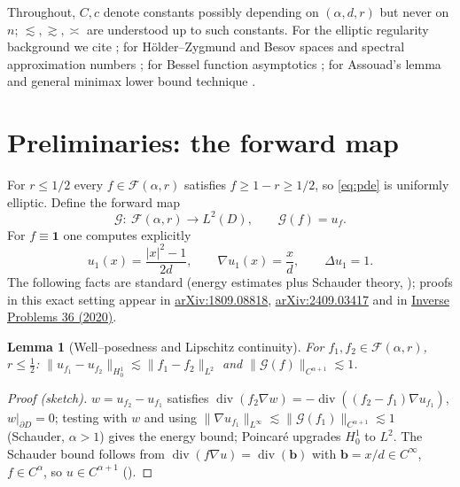 \documentclass[11pt]{article}
\newtheorem{lemma}[theorem]{Lemma}
\newcommand{\1}{\mathbf{1}}
\newcommand{\norm}[1]{\lVert #1\rVert}
\newcommand{\Gf}{\mathcal{G}}
\newcommand{\F}{\mathcal{F}}
\DeclareMathOperator{\divg}{div}
\begin{document}
Throughout, $C,c$ denote constants possibly depending on $(\alpha,d,r)$ but never on $n$;
$\lesssim,\gtrsim,\asymp$ are understood up to such constants. For the elliptic
regularity background we cite \cite{GT}; for H\"older--Zygmund and Besov spaces and
spectral approximation numbers \cite{Triebel}; for Bessel function asymptotics
\cite{Watson,Olver}; for Assouad's lemma and general minimax lower bound technique
\cite{Tsybakov}.

\section{Preliminaries: the forward map}\label{sec:forward}

For $r\le 1/2$ every $f\in\F(\alpha,r)$ satisfies $f\ge 1-r\ge 1/2$, so
\eqref{eq:pde} is uniformly elliptic. Define the forward map
\[
\Gf:\ \F(\alpha,r)\to L^2(D),\qquad \Gf(f)=u_f .
\]
For $f\equiv\1$ one computes explicitly
\begin{equation}\label{eq:u1}
u_1(x)=\frac{|x|^2-1}{2d},\qquad \nabla u_1(x)=\frac{x}{d},\qquad \Delta u_1=1 .
\end{equation}
The following facts are standard (energy estimates plus Schauder theory,
\cite[Chs.~8, 9]{GT}); proofs in this exact setting appear in
\href{https://export.arxiv.org/pdf/1809.08818v3.pdf}{arXiv:1809.08818},
\href{https://arxiv.org/html/2409.03417}{arXiv:2409.03417} and in
\href{https://google.iopscience.iop.org/article/10.1088/1361-6420/ab7d2a}{Inverse Problems 36 (2020)}.

\begin{lemma}[Well--posedness and Lipschitz continuity]\label{lem:lipsch}
For $f_1,f_2\in\F(\alpha,r)$, $r\le\frac12$: $\norm{u_{f_1}-u_{f_2}}_{H^1_0}\lesssim
\norm{f_1-f_2}_{L^2}$ and $\norm{\Gf(f)}_{C^{\alpha+1}}\lesssim 1$.
\end{lemma}

\begin{proof}[Proof (sketch)]
$w=u_{f_2}-u_{f_1}$ satisfies $\divg(f_2\nabla w)=-\divg((f_2-f_1)\nabla u_{f_1})$,
$w|_{\partial D}=0$; testing with $w$ and using
$\norm{\nabla u_{f_1}}_{L^\infty}\lesssim\norm{\Gf(f_1)}_{C^{\alpha+1}}\lesssim 1$
 (Schauder, $\alpha>1$) gives the energy bound; Poincar\'e upgrades $H^1_0$ to $L^2$.
The Schauder bound follows from $\divg(f\nabla u)=\divg(\mathbf b)$ with
$\mathbf b=x/d\in C^\infty$, $f\in C^\alpha$, so $u\in C^{\alpha+1}$
(\cite[Thm.~8.33]{GT}).
\end{proof}
\end{document}
